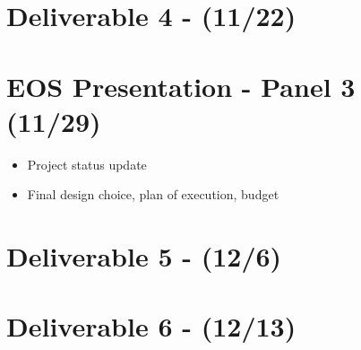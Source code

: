 \documentclass[]{article}
\begin{document}
	\section*{Deliverable 4 - (11/22)}
	\section*{EOS Presentation - Panel 3 (11/29)}
		\begin{itemize}
		\item{Project status update}
		\item{Final design choice, plan of execution, budget}
	\end{itemize}
	\section*{Deliverable 5 - (12/6)}
	\section*{Deliverable 6 - (12/13)}	
\end{document}
